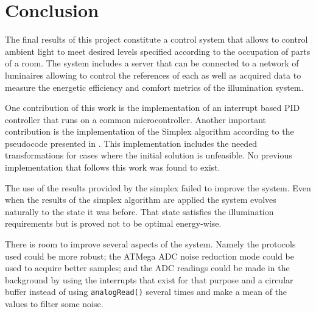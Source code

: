 \section{Conclusion}
\label{conclusion}

The final results of this project constitute a control system that allows to control ambient light to meet desired levels specified according to the occupation of parts of a room. The system includes a server that can be connected to a network of luminaires allowing to control the references of each as well as acquired data to measure the energetic efficiency and comfort metrics of the illumination system.

One contribution of this work is the implementation of an interrupt based PID controller that runs on a common microcontroller. Another important contribution is the implementation of the Simplex algorithm according to the pseudocode presented in \cite{Cormen}. This implementation includes the needed transformations for cases where the initial solution is unfeasible. No previous implementation that follows this work was found to exist.

The use of the results provided by the simplex failed to improve the system. Even when the results of the simplex algorithm are applied the system evolves naturally to the state it was before. That state satisfies the illumination requirements but is proved not to be optimal energy-wise.

There is room to improve several aspects of the system. Namely the protocols used could be more robust; the ATMega ADC noise reduction mode could be used to acquire better samples; and the ADC readings could be made in the background by using the interrupts that exist for that purpose and a circular buffer instead of using \texttt{analogRead()} several times and make a mean of the values to filter some noise.



